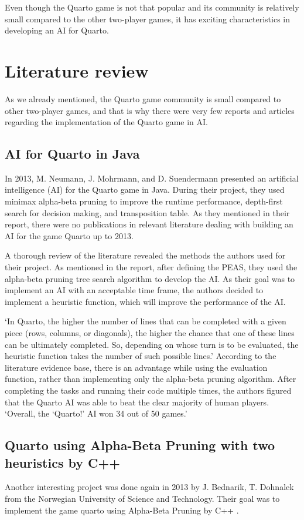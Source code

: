 \documentclass[paper=a4, fontsize=11pt]{article} %
\begin{document}
Even though the Quarto game is not that popular and its community is relatively small compared to the other two-player games, it has exciting characteristics in developing an AI for Quarto. 


\section{Literature review}
As we already mentioned, the Quarto game community is small compared to other two-player games, and that is why there were very few reports and articles regarding the implementation of the Quarto game in AI. 
\subsection{AI for Quarto in Java}
In 2013, M. Neumann, J. Mohrmann, and D. Suendermann presented an artificial intelligence (AI) for the Quarto game in Java. During their project, they used minimax alpha-beta pruning to improve the runtime performance, depth-first search for decision making, and transposition table. As they mentioned in their report, there were no publications in relevant literature dealing with building an AI for the game Quarto up to 2013. \cite{AMohrmann2013}

A thorough review of the literature revealed the methods the authors used for their project. As mentioned in the report, after defining the PEAS, they used the alpha-beta pruning tree search algorithm to develop the AI. As their goal was to implement an AI with an acceptable time frame, the authors decided to implement a heuristic function, which will improve the performance of the AI.

‘In Quarto, the higher the number of lines that can be completed with a given piece (rows, columns, or diagonals), the higher the chance that one of these lines can be ultimately completed. So, depending on whose turn is to be evaluated, the heuristic function takes the number of such possible lines.’ \cite{AMohrmann2013}
According to the literature evidence base, there is an advantage while using the evaluation function, rather than implementing only the alpha-beta pruning algorithm. After completing the tasks and running their code multiple times, the authors figured that the Quarto AI was able to beat the clear majority of human players. ‘Overall, the ‘Quarto!’ AI won 34 out of 50 games.’ \cite{AMohrmann2013}

\subsection{Quarto using Alpha-Beta Pruning with two heuristics by C++}
Another interesting project was done again in 2013 by J. Bednarik, T. Dohnalek from the Norwegian University of Science and Technology. Their goal was to implement the game quarto using Alpha-Beta Pruning by C++ \cite{cpluscode}. 
\end{document}
